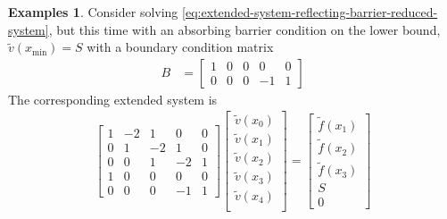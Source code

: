 \documentclass[11pt]{article}
\theoremstyle{definition}
\newtheorem{example}{Examples}[section]
\begin{document}
\begin{example}
	Consider solving \eqref{eq:extended-system-reflecting-barrier-reduced-system}, but this time with an absorbing barrier condition on the lower bound, $\tilde{v}(x_{\min}) = S$ with a boundary condition matrix
	\begin{align}
	B &= \begin{bmatrix}
	1 & 0  & 0 & 0 & 0 \\
	0 & 0 & 0 & -1 & 1
	\end{bmatrix}
	\end{align}
	The corresponding extended system is
	\begin{align}\label{eq:extended-system-absorbing-barrier-before-gaussian-elimination}
	\begin{bmatrix}
	1 & -2 & 1 & 0 & 0 \\
	0 & 1 & -2 & 1 & 0 \\
	0 & 0 & 1 & -2 & 1 \\
	1 & 0  & 0 & 0 & 0 \\
	0 & 0 & 0 & -1 & 1
	\end{bmatrix}
	\begin{bmatrix}
	\tilde{v}(x_0) \\
	\tilde{v}(x_1) \\
	\tilde{v}(x_2) \\
	\tilde{v}(x_3) \\
	\tilde{v}(x_4) \\
	\end{bmatrix}
	=
	\begin{bmatrix}
	\tilde{f}(x_1) \\
	\tilde{f}(x_2) \\
	\tilde{f}(x_3) \\
	S \\
	0
	\end{bmatrix}
	\end{align}


\end{example}
\end{document}
